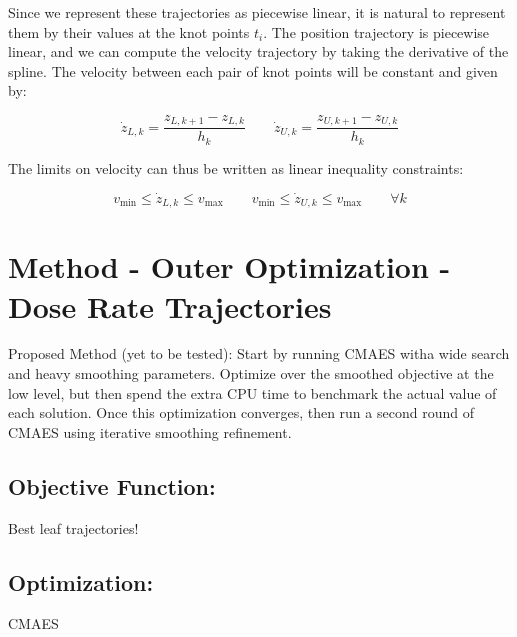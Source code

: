 Since we represent these trajectories as piecewise linear,
it is natural to represent them by their values at the knot points $t_i$.
The position trajectory is piecewise linear,
and we can compute the velocity trajectory by taking the derivative of the spline.
The velocity between each pair of knot points will be constant and given by:

\begin{equation}
  \dot{z}_{L, k} = \frac{z_{L, k+1} - z_{L, k}}{h_k}
  \quad \quad
  \dot{z}_{U, k} = \frac{z_{U, k+1} - z_{U, k}}{h_k}
\end{equation}

The limits on velocity can thus be written as linear inequality constraints:

\begin{equation}
  v_\text{min} \leq \dot{z}_{L, k} \leq v_\text{max}
  \quad \quad
  v_\text{min} \leq \dot{z}_{U, k} \leq v_\text{max}
  \quad \quad \forall k
\end{equation}





\section{Method - Outer Optimization - Dose Rate Trajectories}


Proposed Method (yet to be tested):  Start by running CMAES witha wide search and heavy smoothing
parameters. Optimize over the smoothed objective at the low level, but then spend the extra CPU
time to benchmark the actual value of each solution. Once this optimization converges, then
run a second round of CMAES using iterative smoothing refinement.

\subsection{Objective Function:}

Best leaf trajectories!


\subsection{Optimization:}

CMAES
